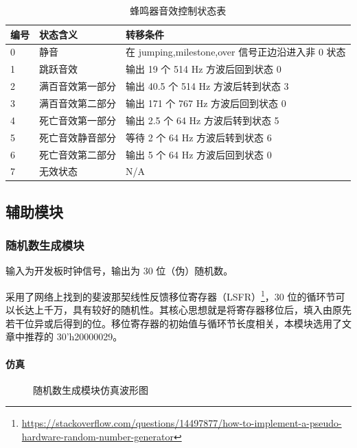 \documentclass[hyperref,UTF8,12pt,a4paper]{ctexart}
\begin{document}
\begin{longtable}[]{@{}lll@{}}
\caption{蜂鸣器音效控制状态表}\tabularnewline
\toprule
编号 & 状态含义 & 转移条件 \\
\midrule
\endhead
0 & 静音 & 在 jumping,milestone,over 信号正边沿进入非 0 状态 \\
1 & 跳跃音效 & 输出 19 个 514 Hz 方波后回到状态 0 \\
2 & 满百音效第一部分 & 输出 40.5 个 514 Hz 方波后转到状态 3 \\
3 & 满百音效第二部分 & 输出 171 个 767 Hz 方波后回到状态 0 \\
4 & 死亡音效第一部分 & 输出 2.5 个 64 Hz 方波后转到状态 5 \\
5 & 死亡音效静音部分 & 等待 2 个 64 Hz 方波后转到状态 6 \\
6 & 死亡音效第二部分 & 输出 5 个 64 Hz 方波后回到状态 0 \\
7 & 无效状态 & N/A \\
\bottomrule
\end{longtable}

\hypertarget{ux8f85ux52a9ux6a21ux5757}{%
\subsection{辅助模块}\label{ux8f85ux52a9ux6a21ux5757}}

\hypertarget{ux968fux673aux6570ux751fux6210ux6a21ux5757}{%
\subsubsection{随机数生成模块}\label{ux968fux673aux6570ux751fux6210ux6a21ux5757}}

输入为开发板时钟信号，输出为 30 位（伪）随机数。

采用了网络上找到的斐波那契线性反馈移位寄存器（LSFR）\footnote{\url{https://stackoverflow.com/questions/14497877/how-to-implement-a-pseudo-hardware-random-number-generator}}，30
位的循环节可以长达上千万，具有较好的随机性。其核心思想就是将寄存器移位后，填入由原先若干位异或后得到的位。移位寄存器的初始值与循环节长度相关，本模块选用了文章中推荐的
30'h20000029。

\hypertarget{ux4effux771f-2}{%
\paragraph{仿真}\label{ux4effux771f-2}}

\begin{figure}[H]
\centering
{}
\caption{随机数生成模块仿真波形图}
\end{figure}
\end{document}
